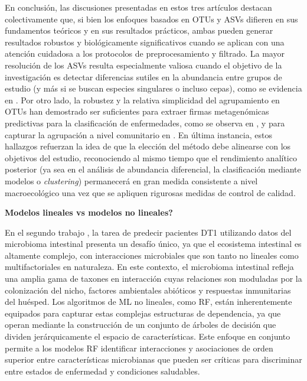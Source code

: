 En conclusión, las discusiones presentadas en estos tres artículos destacan colectivamente que, si bien los enfoques basados en OTUs y ASVs difieren en sus fundamentos teóricos y en sus resultados prácticos, ambas pueden generar resultados robustos y biológicamente significativos cuando se aplican con una atención cuidadosa a los protocolos de preprocesamiento y filtrado. La mayor resolución de los ASVs resulta especialmente valiosa cuando el objetivo de la investigación es detectar diferencias sutiles en la abundancia entre grupos de estudio (y más si se buscan especies singulares o incluso cepas), como se evidencia en \cite{paper1}. Por otro lado, la robustez y la relativa simplicidad del agrupamiento en OTUs han demostrado ser suficientes para extraer firmas metagenómicas predictivas para la clasificación de enfermedades, como se observa en \cite{paper2}, y para capturar la agrupación a nivel comunitario en \cite{paper3}. En última instancia, estos hallazgos refuerzan la idea de que la elección del método debe alinearse con los objetivos del estudio, reconociendo al mismo tiempo que el rendimiento analítico posterior (ya sea en el análisis de abundancia diferencial, la clasificación mediante modelos o \textit{clustering}) permanecerá en gran medida consistente a nivel macroecológico una vez que se apliquen rigurosas medidas de control de calidad.


\textbf{Modelos lineales vs modelos no lineales?} 

En el segundo trabajo \cite{paper2}, la tarea de predecir pacientes DT1 utilizando datos del microbioma intestinal presenta un desafío único, ya que el ecosistema intestinal es altamente complejo, con interacciones microbiales que son tanto no lineales como multifactoriales en naturaleza. En este contexto, el microbioma intestinal refleja una amplia gama de taxones en interacción cuyas relaciones son moduladas por la colonización del nicho, factores ambientales abióticos y respuestas inmunitarias del huésped. Los algoritmos de ML no lineales, como RF, están inherentemente equipados para capturar estas complejas estructuras de dependencia, ya que operan mediante la construcción de un conjunto de árboles de decisión que dividen jerárquicamente el espacio de características. Este enfoque en conjunto permite a los modelos RF identificar interacciones y asociaciones de orden superior entre características microbianas que pueden ser críticas para discriminar entre estados de enfermedad y condiciones saludables.

